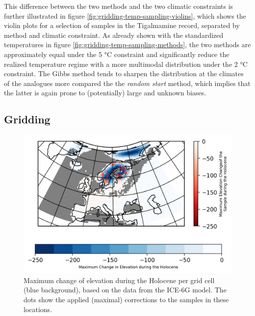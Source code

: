 \begin{refsection}
This difference between the two methods and the two climatic constraints is further illustrated in figure \ref{fig:gridding-temp-sampling-violins}, which shows the violin plots for a selection of samples in the Tigalmamine record, separated by method and climatic constraint. As already shown with the standardized temperatures in figure \ref{fig:gridding-temp-sampling-methods}, the two methods are approximately equal under the 5 °C constraint and significantly reduce the realized temperature regime with a more multimodal distribution under the 2 °C constraint. The Gibbs method tends to sharpen the distribution at the climates of the analogues more compared the the \textit{random start} method, which implies that the latter is again prone to (potentially) large and unknown biases. 

\subsection{Gridding}  \label{sec:gridding-gridding}

\begin{figure}
	\includegraphics[width=\linewidth]{gridding-figures/elevation-difference.png}
	\caption[Elevation difference and corrections]{Maximum change of elevation during the Holocene per grid cell (blue background), based on the data from the ICE-6G model. The dots show the applied (maximal) corrections to the samples in these locations. }
	\label{fig:gridding-elev-correction}
\end{figure}


\end{refsection}
